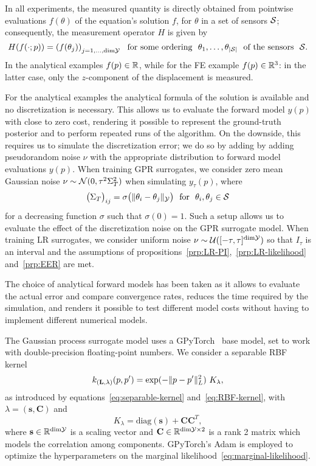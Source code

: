 In all experiments, the measured quantity is directly obtained from pointwise evaluations $f(\theta)$ of the equation's solution $f$, for $\theta$ in a set of sensors $\mathcal S$; consequently, the measurement operator $H$ is given by
\[
    H(f(\cdot; p)) = \left( f(\theta_j)\right)_{j=1,\ldots, \text{dim} \mathcal Y} \ \text{ for some ordering } \ \theta_1, \ldots, \theta_{|\mathcal S|} \ \text{ of the sensors } \ \mathcal S.
\]
In the analytical examples $f(p) \in \mathbb{R}$, while for the FE example $f(p)\in \mathbb{R}^3$: in the latter case, only the $z$-component of the displacement is measured. \medskip

For the analytical examples the analytical formula of the solution is available and no discretization is necessary.
This allows us to evaluate the forward model $y(p)$ with close to zero cost, rendering it possible to represent the ground-truth posterior and to perform repeated runs of the algorithm. 
On the downside, this requires us to simulate the discretization error; we do so by adding by adding pseudorandom noise $\nu$ with the appropriate distribution to forward model evaluations $y(p)$. \newline
When training GPR surrogates, we consider zero mean Gaussian noise $\nu \sim \mathcal N (0, \tau^2 \Sigma_T^2)$ when simulating $y_\tau(p)$, where \[
\big(\Sigma_T\big)_{ij} = \sigma\big( \|\theta_i - \theta_j\|_{\mathcal Y} \big) \ \text{ for } \ \theta_i, \theta_j \in \mathcal S
\]
for a decreasing function $\sigma$ such that $\sigma(0)=1$.
Such a setup allows us to evaluate the effect of the discretization noise on the GPR surrogate model.\newline
When training LR surrogates, we consider uniform noise $\nu \sim \mathcal U([-\tau, \tau]^{\text{dim} \mathcal Y})$ so that $I_\tau$ is an interval and the assumptions of propositions~\ref{prp:LR-PI},~\ref{prp:LR-likelihood} and~\ref{prp:EER} are met. \medskip 

The choice of analytical forward models has been taken as it allows to evaluate the actual error and compare convergence rates, reduces the time required by the simulation, and renders it possible to test different model costs without having to implement different numerical models. \medskip 

The Gaussian process surrogate model uses a GPyTorch~\cite{GPyTorchPaper} base model, set to work with double-precision floating-point numbers.
We consider a separable RBF kernel 
\[
    k_{(\mathbf{L}, \lambda)}(p, p') =  \exp ( - \lVert p - p'\rVert^2_{L} ) \ K_\lambda,
\]
as introduced by equations~\eqref{eq:separable-kernel} and~\eqref{eq:RBF-kernel}, with $\lambda = (\mathbf{s}, \mathbf{C}) $ and
\[
K_\lambda = \text{diag}(\mathbf{s}) + \mathbf{CC}^T,
\] 
where $\mathbf{s} \in \mathbb{R}^{\text{dim} \mathcal Y}$ is a scaling vector and $\mathbf{C} \in \mathbb{R}^{\text{dim} \mathcal Y \times 2}$ is a rank 2 matrix which models the correlation among components.
GPyTorch's Adam is employed to optimize the hyperparameters on the marginal likelihood~\eqref{eq:marginal-likelihood}. \medskip

